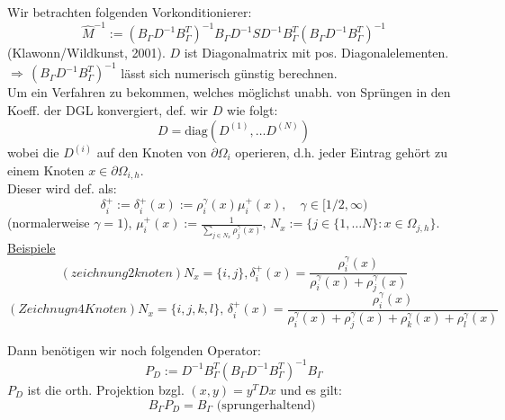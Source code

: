 Wir betrachten folgenden Vorkonditionierer:
\[\hat M^{-1} := (B_\Gamma D^{-1} B^T_\Gamma )^{-1} B_\Gamma D^{-1} S D^{-1} B^T_\Gamma (B_\Gamma D^{-1} B^T_\Gamma)^{-1} \]
(Klawonn/Wildkunst, 2001). $D$ ist Diagonalmatrix mit pos. Diagonalelementen.\\
$\Rightarrow \, (B_\Gamma D^{-1}B^T_\Gamma)^{-1} $ lässt sich numerisch günstig berechnen.\\
Um ein Verfahren zu bekommen, welches möglichst unabh. von Sprüngen in den Koeff. der DGL konvergiert, def. wir $D$ wie folgt:
\[ D= \text{diag}\left( D^{(1)},\dots D^{(N)} \right) \]
wobei die $D^{(i)}$ auf den Knoten von $\partial \Omega_i$ operieren, d.h. jeder Eintrag gehört zu einem Knoten $x \in \partial \Omega_{i,h}$.\\
Dieser wird def. als:
\[ \delta^+_i := \delta^+_i (x) := \rho^\gamma_i(x)\mu^+_i(x), \quad \gamma \in [1/2,\infty) \]
(normalerweise $\gamma=1$), $\mu^+_i(x) :=\frac{1} { \sum_{j \in N_x} \rho^\gamma_j (x)} ,\, N_x := \{ j \in \{ 1,\dots N\} : x \in \Omega_{j,h} \}$.\\
\underline{Beispiele}\\
\[ (zeichnung 2 knoten)  N_x=\{i,j\} , \delta^+_i(x)=\frac{\rho^\gamma_i(x) }{\rho^\gamma_i(x)  + \rho^\gamma_j(x) } \]
\[ (Zeichnugn 4 Knoten) N_x=\{i,j,k,l \}, \,  \delta^+_i(x)=\frac{\rho^\gamma_i(x) }{\rho^\gamma_i(x)  + \rho^\gamma_j(x) + \rho^\gamma_k(x)  + \rho^\gamma_l(x) } \]

Dann benötigen wir noch folgenden Operator:
\[ P_D := D^{-1}B^T_\Gamma (B_\Gamma D^{-1} B^T_\Gamma)^{-1} B_\Gamma \]
$P_D$ ist die orth. Projektion bzgl. $(x,y)=y^TDx$ und es gilt:
\[ B_\Gamma P_D = B_\Gamma \text{ (sprungerhaltend) } \]




